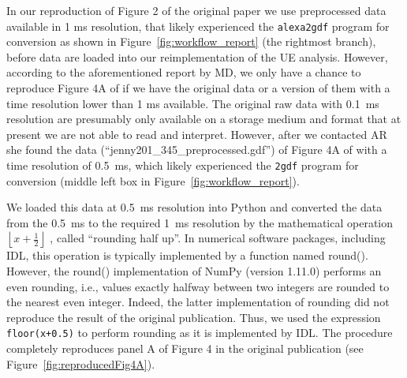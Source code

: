 \documentclass[10pt,a4paper,onecolumn]{article}
\begin{document}
In our reproduction of Figure 2 of the original paper we use
preprocessed data available in 1 ms resolution, that likely experienced
the \texttt{alexa2gdf} program for conversion as shown in
Figure~\ref{fig:workflow_report} (the rightmost branch), before data are
loaded into our reimplementation of the UE analysis. However, according
to the aforementioned report by MD, we only have a chance to reproduce
Figure 4A of \autocite{Riehle97} if we have the original data or a
version of them with a time resolution lower than 1 ms available. The
original raw data with 0.1~ms resolution are presumably only available
on a storage medium and format that at present we are not able to read
and interpret. However, after we contacted AR she found the data
(``jenny201\_345\_preprocessed.gdf'') of Figure 4A of
\autocite{Riehle97} with a time resolution of 0.5~ms, which likely
experienced the \texttt{2gdf} program for conversion (middle left box in
Figure~\ref{fig:workflow_report}).

We loaded this data at 0.5~ms resolution into Python and converted the
data from the 0.5~ms to the required 1~ms resolution by the mathematical
operation \(\left\lfloor x+\frac{1}{2}\right\rfloor\) , called
``rounding half up''. In numerical software packages, including IDL,
this operation is typically implemented by a function named round().
However, the round() implementation of NumPy (version 1.11.0) performs
an even rounding, i.e., values exactly halfway between two integers are
rounded to the nearest even integer. Indeed, the latter implementation
of rounding did not reproduce the result of the original publication.
Thus, we used the expression \texttt{floor(x+0.5)} to perform rounding
as it is implemented by IDL. The procedure completely reproduces panel A
of Figure 4 in the original publication (see
Figure~\ref{fig:reproducedFig4A}).
\end{document}
